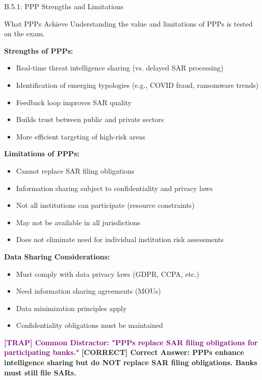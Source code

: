 \documentclass[11pt,a4paper]{beamer}
\newcommand{\trap}[1]{\textcolor{purple}{\textbf{[TRAP] #1}}}
\newcommand{\correct}[1]{\textcolor{green!50!black}{\textbf{[CORRECT] #1}}}
\begin{document}
	\begin{frame}{B.5.1: PPP Strengths and Limitations}
		\begin{block}{What PPPs Achieve}
			Understanding the value and limitations of PPPs is tested on the exam.
		\end{block}
		\textbf{Strengths of PPPs:}
		\begin{itemize}
			\item Real-time threat intelligence sharing (vs. delayed SAR processing)
			\item Identification of emerging typologies (e.g., COVID fraud, ransomware trends)
			\item Feedback loop improves SAR quality
			\item Builds trust between public and private sectors
			\item More efficient targeting of high-risk areas
		\end{itemize}
		\textbf{Limitations of PPPs:}
		\begin{itemize}
			\item Cannot replace SAR filing obligations
			\item Information sharing subject to confidentiality and privacy laws
			\item Not all institutions can participate (resource constraints)
			\item May not be available in all jurisdictions
			\item Does not eliminate need for individual institution risk assessments
		\end{itemize}
		\textbf{Data Sharing Considerations:}
		\begin{itemize}
			\item Must comply with data privacy laws (GDPR, CCPA, etc.)
			\item Need information sharing agreements (MOUs)
			\item Data minimization principles apply
			\item Confidentiality obligations must be maintained
		\end{itemize}
		\trap{Common Distractor: "PPPs replace SAR filing obligations for participating banks."}
		\correct{Correct Answer: PPPs enhance intelligence sharing but do NOT replace SAR filing obligations. Banks must still file SARs.}
	\end{frame}
	
	
\end{document}
